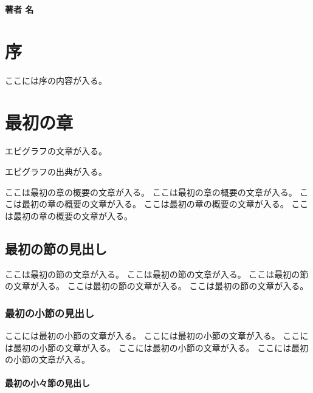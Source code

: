 \documentclass[ %
  a5paper,%
  papersize%
]{ltjsbook}
\begin{document}
\begin{titlepage}
  \vspace*{10mm}
  \vfill

  \begin{flushright}
    {\gtfamily\bfseries\huge 著者 名}
  \end{flushright}

  \vspace{20mm}
\end{titlepage}

\frontmatter

\chapter{序}

ここには序の内容が入る。

\tableofcontents %

\mainmatter

\chapter{最初の章}

\epigraph{エピグラフの文章が入る。}{エピグラフの出典が入る。}

\begin{summary}
ここは最初の章の概要の文章が入る。
ここは最初の章の概要の文章が入る。
ここは最初の章の概要の文章が入る。
ここは最初の章の概要の文章が入る。
ここは最初の章の概要の文章が入る。
\end{summary}

\section{最初の節の見出し}

ここは最初の節の文章が入る。
ここは最初の節の文章が入る。
ここは最初の節の文章が入る。
ここは最初の節の文章が入る。
ここは最初の節の文章が入る。

\subsection{最初の小節の見出し}

ここには最初の小節の文章が入る。
ここには最初の小節の文章が入る。
ここには最初の小節の文章が入る。
ここには最初の小節の文章が入る。
ここには最初の小節の文章が入る。

\subsubsection{最初の小々節の見出し}
\end{document}
